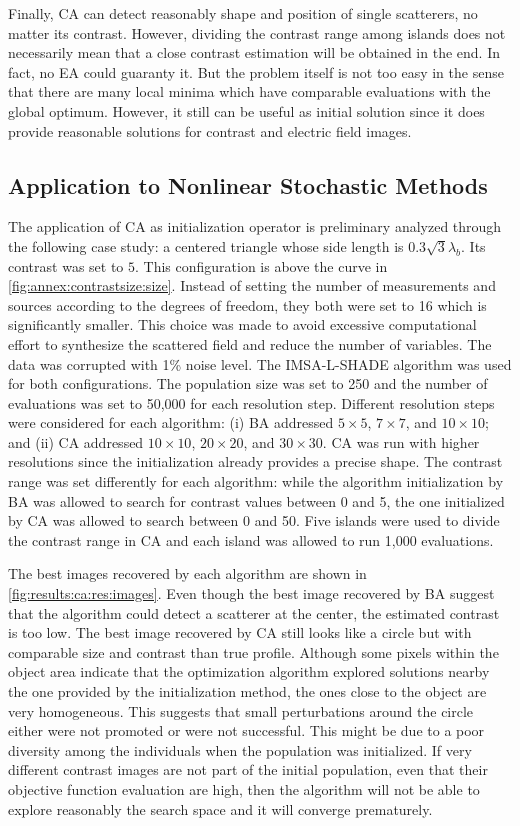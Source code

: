 			Finally, CA can detect reasonably shape and position of single scatterers, no matter its contrast. However, dividing the contrast range among islands does not necessarily mean that a close contrast estimation will be obtained in the end. In fact, no EA could guaranty it. But the problem itself is not too easy in the sense that there are many local minima which have comparable evaluations with the global optimum. However, it still can be useful as initial solution since it does provide reasonable solutions for contrast and electric field images.
		
		\subsection{Application to Nonlinear Stochastic Methods}\label{chap:results:ca:application}
		
			The application of CA as initialization operator is preliminary analyzed through the following case study: a centered triangle whose side length is $0.3\sqrt{3}\lambda_b$. Its contrast was set to $5$. This configuration is above the curve in \ref{fig:annex:contrastsize:size}. Instead of setting the number of measurements and sources according to the degrees of freedom, they both were set to 16 which is significantly smaller. This choice was made to avoid excessive computational effort to synthesize the scattered field and reduce the number of variables. The data was corrupted with 1\% noise level. The IMSA-L-SHADE algorithm was used for both configurations. The population size was set to 250 and the number of evaluations was set to 50,000 for each resolution step. Different resolution steps were considered for each algorithm: (i) BA addressed $5\times5$, $7\times7$, and $10\times10$; and (ii) CA addressed $10\times10$, $20\times20$, and $30\times30$. CA was run with higher resolutions since the initialization already provides a precise shape. The contrast range was set differently for each algorithm: while the algorithm initialization by BA was allowed to search for contrast values between 0 and 5, the one initialized by CA was allowed to search between 0 and 50. Five islands were used to divide the contrast range in CA and each island was allowed to run 1,000 evaluations.
			
			The best images recovered by each algorithm are shown in \autoref{fig:results:ca:res:images}. Even though the best image recovered by BA suggest that the algorithm could detect a scatterer at the center, the estimated contrast is too low. The best image recovered by CA still looks like a circle but with comparable size and contrast than true profile. Although some pixels within the object area indicate that the optimization algorithm explored solutions nearby the one provided by the initialization method, the ones close to the object are very homogeneous. This suggests that small perturbations around the circle either were not promoted or were not successful. This might be due to a poor diversity among the individuals when the population was initialized. If very different contrast images are not part of the initial population, even that their objective function evaluation are high, then the algorithm will not be able to explore reasonably the search space and it will converge prematurely.
		
